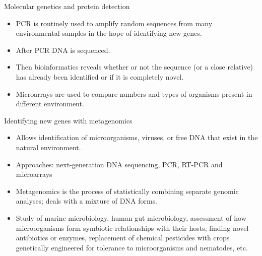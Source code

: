 \documentclass[
  ignorenonframetext,
  aspectratio=169]{beamer}
\providecommand{\tightlist}{%
  \setlength{\itemsep}{0pt}\setlength{\parskip}{0pt}}
\begin{document}
\begin{frame}{Molecular genetics and protein detection}
\protect\hypertarget{molecular-genetics-and-protein-detection}{}
\begin{itemize}
\tightlist
\item
  PCR is routinely used to amplify random sequences from many
  environmental samples in the hope of identifying new genes.
\item
  After PCR DNA is sequenced.
\item
  Then bioinformatics reveals whether or not the sequence (or a close
  relative) has already been identified or if it is completely novel.
\item
  Microarrays are used to compare numbers and types of organisms present
  in different environment.
\end{itemize}
\end{frame}

\begin{frame}{Identifying new genes with metagenomics}
\protect\hypertarget{identifying-new-genes-with-metagenomics}{}
\begin{itemize}
\tightlist
\item
  Allows identification of microorganisms, viruses, or free DNA that
  exist in the natural environment.
\item
  Approaches: next-generation DNA sequencing, PCR, RT-PCR and
  microarrays
\item
  Metagenomics is the process of statistically combining separate
  genomic analyses; deals with a mixture of DNA forms.
\item
  Study of marine microbiology, human gut microbiology, assessment of
  how microorganisms form symbiotic relationships with their hosts,
  finding novel antibiotics or enzymes, replacement of chemical
  pesticides with crops genetically engineered for tolerance to
  microorganisms and nematodes, etc.
\end{itemize}
\end{frame}
\end{document}
